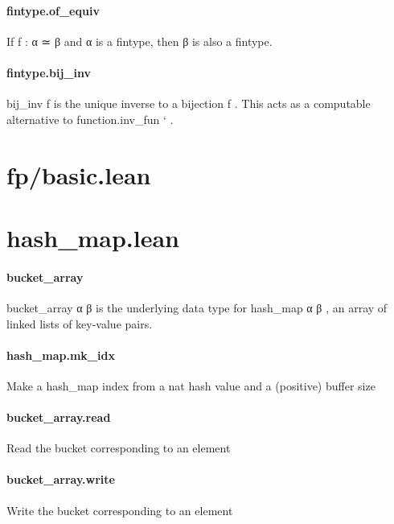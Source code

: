 \documentclass{article}
\begin{document}
\paragraph{fintype.of\_equiv}
\par
If 
\colorbox[RGB]{253,246,227}{{{{\color[RGB]{101, 123, 131} f : α ≃ β }}}} and 
\colorbox[RGB]{253,246,227}{{{{\color[RGB]{101, 123, 131} α }}}} is a fintype, then 
\colorbox[RGB]{253,246,227}{{{{\color[RGB]{101, 123, 131} β }}}} is also a fintype.
\paragraph{fintype.bij\_inv}
\par
\colorbox[RGB]{253,246,227}{}bij\_inv f
\colorbox[RGB]{253,246,227}{{{{\color[RGB]{101, 123, 131} is the unique inverse to a bijection }}}}f
\colorbox[RGB]{253,246,227}{{{{\color[RGB]{101, 123, 131} . This acts  }}}{{{\color[RGB]{133, 153, 0} as }}}{{{\color[RGB]{101, 123, 131}  a computable alternative to  }}}}function.inv\_fun
`
.
\section{fp/basic.lean}\section{hash\_map.lean}\paragraph{bucket\_array}
\par
\colorbox[RGB]{253,246,227}{{{{\color[RGB]{101, 123, 131} bucket\_array α β }}}} is the underlying data type for 
\colorbox[RGB]{253,246,227}{{{{\color[RGB]{101, 123, 131} hash\_map α β }}}},
an array of linked lists of key-value pairs.
\paragraph{hash\_map.mk\_idx}
\par
Make a hash\_map index from a 
\colorbox[RGB]{253,246,227}{{{{\color[RGB]{101, 123, 131} nat }}}} hash value and a (positive) buffer size
\paragraph{bucket\_array.read}
\par
Read the bucket corresponding to an element
\paragraph{bucket\_array.write}
\par
Write the bucket corresponding to an element
\end{document}
